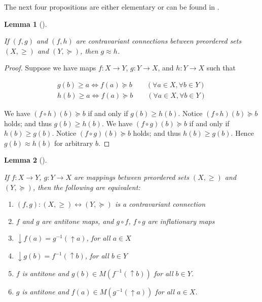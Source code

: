 \documentclass[
  letterpaper,
  10pt,
  reqno,
  twopage,
  openany]{book}
\providecommand{\tightlist}{%
  \setlength{\itemsep}{0pt}\setlength{\parskip}{0pt}}\usepackage{longtable,booktabs,array}
\theoremstyle{plain}
\newtheorem{lemma}{Lemma}[chapter]
\theoremstyle{definition}
\theoremstyle{definition}
\theoremstyle{definition}
\theoremstyle{plain}
\theoremstyle{plain}
\theoremstyle{remark}
\begin{document}
The next four propositions are either elementary or can be found in
\cite{soft}.

\leavevmode{}%
\begin{lemma}[]\label{lem-pairequiv}

If \((f,g)\) and \((f, h)\) are contravariant connections between
preordered sets \((X,\geq)\) and \((Y,\succeq)\), then \(g\approx h\).

\end{lemma}

\begin{proof}

Suppose we have maps \(f:X \to Y\), \(g:Y\to X\), and \(h:Y\to X\) such
that

\begin{align}
\label{ugc1}
g(b)\geq a \Leftrightarrow  f(a)\succeq b  
\qquad  (\forall a\in X, \forall b\in Y)  \\
\label{ugc2}
h(b)\geq a \Leftrightarrow f(a)\succeq b
\qquad  (\forall a\in X, \forall b\in Y) 
\end{align}

We have \((f\circ h)(b)\succeq b\) if and only if \(g(b)\geq h(b)\).
Notice \((f\circ h)(b)\succeq b\) holds; and thus \(g(b)\geq h(b)\). We
have \((f\circ g)(b)\succeq b\) if and only if \(h(b)\geq g(b)\). Notice
\((f\circ g)(b)\succeq b\) holds; and thus \(h(b)\geq g(b)\). Hence
\(g(b)\approx h(b)\) for arbitrary \(b\).

\end{proof}

\leavevmode{}%
\begin{lemma}[]\label{lem-connprop}

If \(f:X\to Y\), \(g:Y\to X\) are mappings between preordered sets
\((X,\geq)\) and \((Y,\succeq)\), then the following are equivalent:

\begin{enumerate}
\def\labelenumi{\arabic{enumi}.}
\tightlist
\item
  \((f,g):(X,\geq) \leftrightarrow (Y,\succeq)\) is a contravariant
  connection
\item
  \(f\) and \(g\) are antitone maps, and \(g\circ f\), \(f\circ g\) are
  inflationary maps
\item
  \({\downarrow} f(a)=g^{-1}({\uparrow} a)\), for all \(a\in X\)
\item
  \({\downarrow} g(b)=f^{-1}({\uparrow} b)\), for all \(b\in Y\)
\item
  \(f\) is antitone and \(g(b)\in M(f^{-1}({\uparrow} b))\) for all
  \(b\in Y\).
\item
  \(g\) is antitone and \(f(a)\in M(g^{-1}({\uparrow} a))\) for all
  \(a\in X\).
\end{enumerate}

\end{lemma}
\end{document}
